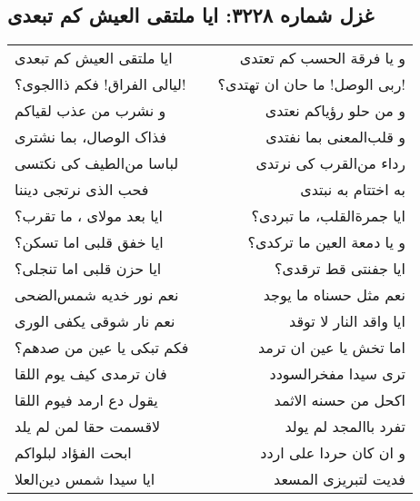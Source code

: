 \begin{center}
\section*{غزل شماره ۳۲۲۸: ایا ملتقی العیش کم تبعدی}
\label{sec:3228}
\begin{longtable}{l p{0.5cm} r}
ایا ملتقی العیش کم تبعدی
&&
و یا فرقة الحسب کم تعتدی
\\
لیالی الفراق! فکم ذاالجوی؟!
&&
ربی الوصل! ما حان ان تهتدی؟!
\\
و نشرب من عذب لقیاکم
&&
و من حلو رؤیاکم نعتدی
\\
فذاک الوصال، بما نشتری
&&
و قلب‌المعنی بما نفتدی
\\
لباسا من‌الطیف کی نکتسی
&&
رداء من‌القرب کی نرتدی
\\
فحب الذی نرتجی دیننا
&&
به اختتام به نبتدی
\\
ایا بعد مولای ، ما تقرب؟
&&
ایا جمرةالقلب، ما تبردی؟
\\
ایا خفق قلبی اما تسکن؟
&&
و یا دمعة العین ما ترکدی؟
\\
ایا حزن قلبی اما تنجلی؟
&&
ایا جفنتی قط ترقدی؟
\\
نعم نور خدیه شمس‌الضحی
&&
نعم مثل حسناه ما یوجد
\\
نعم نار شوقی یکفی الوری
&&
ایا واقد النار لا توقد
\\
فکم تبکی یا عین من صدهم؟
&&
اما تخش یا عین ان ترمد
\\
فان ترمدی کیف یوم اللقا
&&
تری سیدا مفخرالسودد
\\
یقول دع ارمد فیوم اللقا
&&
اکحل من حسنه الاثمد
\\
لاقسمت حقا لمن لم یلد
&&
تفرد باالمجد لم یولد
\\
ابحت الفؤاد لبلواکم
&&
و ان کان حردا علی اردد
\\
ایا سیدا شمس دین‌العلا
&&
فدیت لتبریزی المسعد
\\
\end{longtable}
\end{center}
